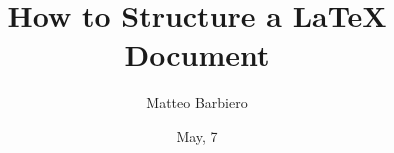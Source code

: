
\usepackage[backend=bibtex,
	sorting=none,
	doi=false,
	url=false,
	isbn=false,
	backref=true,
	eprint=false]{biblatex}		%
	

\title{How to Structure a LaTeX Document}
\author{Matteo Barbiero}
\date{May, 7 }


	\maketitle
	\tableofcontents
	
	\newpage		
	\printbibliography



